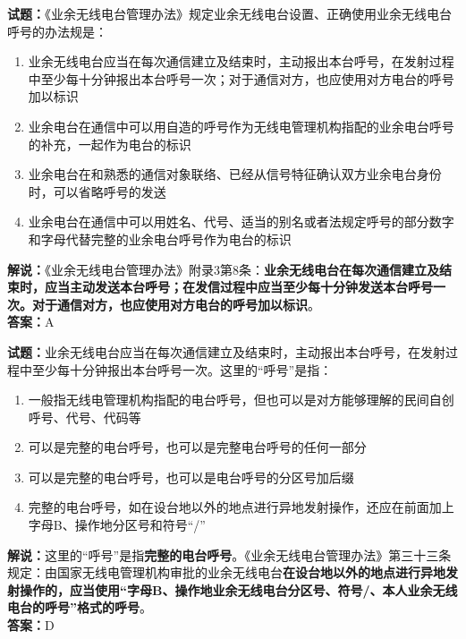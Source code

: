 \documentclass{ctexbook}
\begin{document}
\bigskip


\noindent\textbf{试题：}《业余无线电台管理办法》规定业余无线电台设置、正确使用业余无线电台呼号的办法规是：
\begin{enumerate}[leftmargin=3em]
\item 业余无线电台应当在每次通信建立及结束时，主动报出本台呼号，在发射过程中至少每十分钟报出本台呼号一次；对于通信对方，也应使用对方电台的呼号加以标识
\item 业余电台在通信中可以用自造的呼号作为无线电管理机构指配的业余电台呼号的补充，一起作为电台的标识
\item 业余电台在和熟悉的通信对象联络、已经从信号特征确认双方业余电台身份时，可以省略呼号的发送
\item 业余电台在通信中可以用姓名、代号、适当的别名或者法规定呼号的部分数字和字母代替完整的业余电台呼号作为电台的标识
\end{enumerate}
\noindent\textbf{解说：}《业余无线电台管理办法》附录3第8条：\textbf{业余无线电台在每次通信建立及结束时，应当主动发送本台呼号；在发信过程中应当至少每十分钟发送本台呼号一次。对于通信对方，也应使用对方电台的呼号加以标识}。\\\noindent\textbf{答案：}A



\bigskip


\noindent\textbf{试题：}业余无线电台应当在每次通信建立及结束时，主动报出本台呼号，在发射过程中至少每十分钟报出本台呼号一次。这里的“呼号”是指：
\begin{enumerate}[leftmargin=3em]
\item 一般指无线电管理机构指配的电台呼号，但也可以是对方能够理解的民间自创呼号、代号、代码等
\item 可以是完整的电台呼号，也可以是完整电台呼号的任何一部分
\item 可以是完整的电台呼号，也可以是电台呼号的分区号加后缀
\item 完整的电台呼号，如在设台地以外的地点进行异地发射操作，还应在前面加上字母B、操作地分区号和符号“/”
\end{enumerate}
\noindent\textbf{解说：}这里的“呼号”是指\textbf{完整的电台呼号}。《业余无线电台管理办法》第三十三条规定：由国家无线电管理机构审批的业余无线电台\textbf{在设台地以外的地点进行异地发射操作的，应当使用“字母B、操作地业余无线电台分区号、符号/、本人业余无线电台的呼号”格式的呼号}。\\\noindent\textbf{答案：}D



\bigskip
\end{document}
